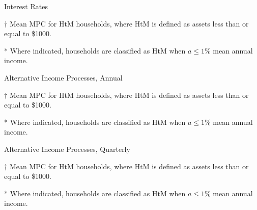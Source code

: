 \documentclass[9pt]{extarticle}
\begin{document}
\begin{table}[h]
\caption{Interest Rates}
\begin{threeparttable}
\centering


\begin{tablenotes}
	\item[$\dagger$] Mean MPC for HtM households, where HtM is defined as assets less than or equal to \$1000.
	\item[*] Where indicated, households are classified as HtM when $a \leq 1\%$ mean annual income.
\end{tablenotes}
\end{threeparttable}
\end{table}

\begin{table}[h]
\caption{Alternative Income Processes, Annual}
\begin{threeparttable}
\centering


\begin{tablenotes}
	\item[$\dagger$] Mean MPC for HtM households, where HtM is defined as assets less than or equal to \$1000.
	\item[*] Where indicated, households are classified as HtM when $a \leq 1\%$ mean annual income.
\end{tablenotes}
\end{threeparttable}
\end{table}

\begin{table}[h]
\caption{Alternative Income Processes, Quarterly}
\begin{threeparttable}
\centering


\begin{tablenotes}
	\item[$\dagger$] Mean MPC for HtM households, where HtM is defined as assets less than or equal to \$1000.
	\item[*] Where indicated, households are classified as HtM when $a \leq 1\%$ mean annual income.
\end{tablenotes}
\end{threeparttable}
\end{table}
\end{document}
